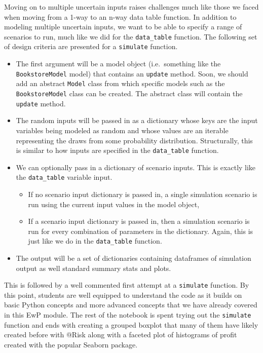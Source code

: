 \documentclass[ited,blindrev]{informs3}              %
\newcommand{\code}[1]{\texttt{#1}}
\begin{document}
Moving on to multiple uncertain inputs raises challenges much like those we faced when moving from a 1-way to an n-way data table function. In addition to modeling multiple uncertain inputs, we want to be able to specify a range of scenarios to run, much like we did for the \code{data\_table} function. The following set of design criteria are presented for a \code{simulate} function.

\begin{itemize}
	\item
	The first argument will be a model object (i.e.~something like the
	\code{BookstoreModel} model) that contains an \code{update}
	method. Soon, we should add an abstract \code{Model} class from
	which specific models such as the \texttt{BookstoreModel} class can be
	created. The abstract class will contain the \code{update} method.
	\item
	The random inputs will be passed in as a dictionary whose keys are the
	input variables being modeled as random and whose values are an
	iterable representing the draws from some probability distribution.
	Structurally, this is similar to how inputs are specified in the
	\code{data\_table} function.
	\item
	We can optionally pass in a dictionary of scenario inputs. This is
	exactly like the \code{data\_table} variable input.
	
	\begin{itemize}
		\item
		If no scenario input dictionary is passed in, a single simulation
		scenario is run using the current input values in the model object,
		\item
		If a scenario input dictionary is passed in, then a simulation
		scenario is run for every combination of parameters in the
		dictionary. Again, this is just like we do in the
		\code{data\_table} function.
	\end{itemize}
	\item
	The output will be a set of dictionaries containing dataframes of
	simulation output as well standard summary stats and plots.
\end{itemize}

This is followed by a well commented first attempt at a \code{simulate} function. By this point, students are well equipped to understand the code as it builds on basic Python concepts and more advanced concepts that we have already covered in this EwP module. The rest of the notebook is spent trying out the \code{simulate} function and ends with creating a grouped boxplot that many of them have likely created before with @Risk along with a faceted plot of histograms of profit created with the popular Seaborn package.
\end{document}
